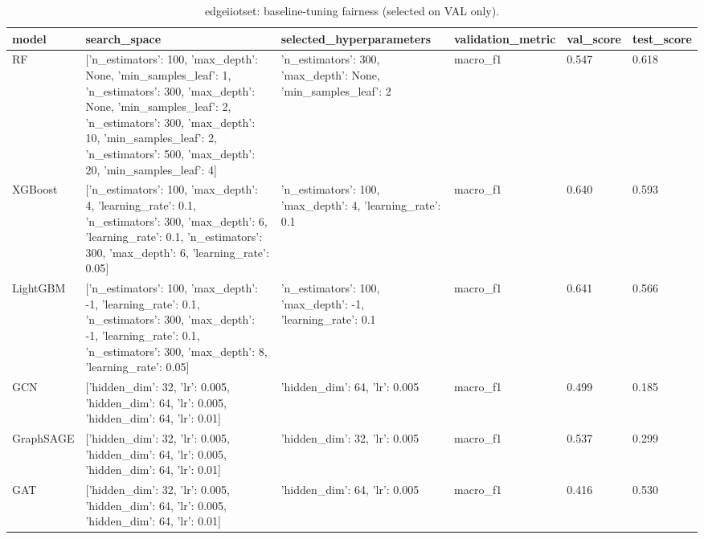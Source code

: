 \begin{table}[t]
\centering
\caption{edgeiiotset: baseline-tuning fairness (selected on VAL only).}
\label{tab:edgeiiotset_baseline_tuning}
\begin{tabular}{llllll}
\toprule
model & search\_space & selected\_hyperparameters & validation\_metric & val\_score & test\_score \\
\midrule
RF & [{'n\_estimators': 100, 'max\_depth': None, 'min\_samples\_leaf': 1}, {'n\_estimators': 300, 'max\_depth': None, 'min\_samples\_leaf': 2}, {'n\_estimators': 300, 'max\_depth': 10, 'min\_samples\_leaf': 2}, {'n\_estimators': 500, 'max\_depth': 20, 'min\_samples\_leaf': 4}] & {'n\_estimators': 300, 'max\_depth': None, 'min\_samples\_leaf': 2} & macro\_f1 & 0.547 & 0.618 \\
XGBoost & [{'n\_estimators': 100, 'max\_depth': 4, 'learning\_rate': 0.1}, {'n\_estimators': 300, 'max\_depth': 6, 'learning\_rate': 0.1}, {'n\_estimators': 300, 'max\_depth': 6, 'learning\_rate': 0.05}] & {'n\_estimators': 100, 'max\_depth': 4, 'learning\_rate': 0.1} & macro\_f1 & 0.640 & 0.593 \\
LightGBM & [{'n\_estimators': 100, 'max\_depth': -1, 'learning\_rate': 0.1}, {'n\_estimators': 300, 'max\_depth': -1, 'learning\_rate': 0.1}, {'n\_estimators': 300, 'max\_depth': 8, 'learning\_rate': 0.05}] & {'n\_estimators': 100, 'max\_depth': -1, 'learning\_rate': 0.1} & macro\_f1 & 0.641 & 0.566 \\
GCN & [{'hidden\_dim': 32, 'lr': 0.005}, {'hidden\_dim': 64, 'lr': 0.005}, {'hidden\_dim': 64, 'lr': 0.01}] & {'hidden\_dim': 64, 'lr': 0.005} & macro\_f1 & 0.499 & 0.185 \\
GraphSAGE & [{'hidden\_dim': 32, 'lr': 0.005}, {'hidden\_dim': 64, 'lr': 0.005}, {'hidden\_dim': 64, 'lr': 0.01}] & {'hidden\_dim': 32, 'lr': 0.005} & macro\_f1 & 0.537 & 0.299 \\
GAT & [{'hidden\_dim': 32, 'lr': 0.005}, {'hidden\_dim': 64, 'lr': 0.005}, {'hidden\_dim': 64, 'lr': 0.01}] & {'hidden\_dim': 64, 'lr': 0.005} & macro\_f1 & 0.416 & 0.530 \\
\bottomrule
\end{tabular}
\end{table}
